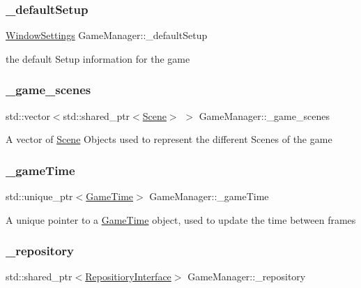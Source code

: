 \subsubsection{\texorpdfstring{\+\_\+default\+Setup}{\_defaultSetup}}
{\footnotesize\ttfamily \hyperlink{struct_window_settings}{Window\+Settings} Game\+Manager\+::\+\_\+default\+Setup\hspace{0.3cm}{\ttfamily [private]}}

the default Setup information for the game \mbox{\label{class_game_manager_a6be6c6b38c1b95d7fd84819eba50e618}} 
\subsubsection{\texorpdfstring{\+\_\+game\+\_\+scenes}{\_game\_scenes}}
{\footnotesize\ttfamily std\+::vector$<$std\+::shared\+\_\+ptr$<$\hyperlink{class_scene}{Scene}$>$ $>$ Game\+Manager\+::\+\_\+game\+\_\+scenes\hspace{0.3cm}{\ttfamily [private]}}

A vector of \hyperlink{class_scene}{Scene} Objects used to represent the different Scenes of the game \mbox{\label{class_game_manager_ae08fe7df616e789e4858645b56d9b73b}} 
\subsubsection{\texorpdfstring{\+\_\+game\+Time}{\_gameTime}}
{\footnotesize\ttfamily std\+::unique\+\_\+ptr$<$\hyperlink{class_game_time}{Game\+Time}$>$ Game\+Manager\+::\+\_\+game\+Time\hspace{0.3cm}{\ttfamily [private]}}

A unique pointer to a \hyperlink{class_game_time}{Game\+Time} object, used to update the time between frames \mbox{\label{class_game_manager_adf8ffad3969c2bee2332eb3ea58a3c9c}} 
\subsubsection{\texorpdfstring{\+\_\+repository}{\_repository}}
{\footnotesize\ttfamily std\+::shared\+\_\+ptr$<$\hyperlink{class_repositiory_interface}{Repositiory\+Interface}$>$ Game\+Manager\+::\+\_\+repository\hspace{0.3cm}{\ttfamily [private]}}

